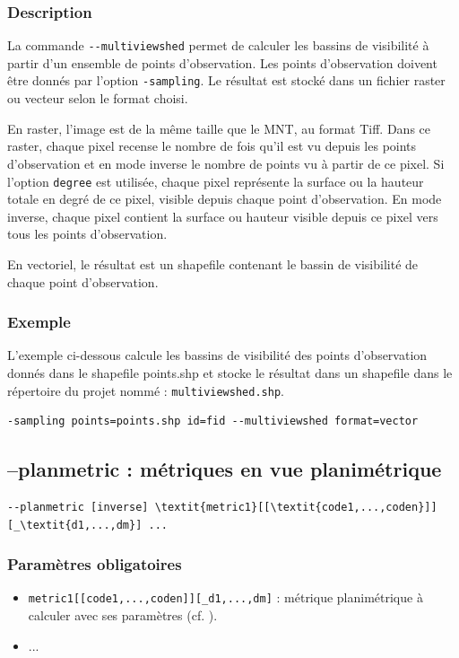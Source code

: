 \documentclass{report}
\begin{document}
\subsubsection{Description}
La commande \verb|--multiviewshed| permet de calculer les bassins de visibilité à partir d'un ensemble de points d'observation. Les points d'observation doivent être donnés par l'option \verb|-sampling|. Le résultat est stocké dans un fichier raster ou vecteur selon le format choisi. 

En raster, l'image est de la même taille que le MNT, au format Tiff. Dans ce raster, chaque pixel recense le nombre de fois qu'il est vu depuis les points d'observation et en mode inverse le nombre de points vu à partir de ce pixel. Si l'option \verb|degree| est utilisée, chaque pixel représente la surface ou la hauteur totale en degré de ce pixel, visible depuis chaque point d'observation. En mode inverse, chaque pixel contient la surface ou hauteur visible depuis ce pixel vers tous les points d'observation.

En vectoriel, le résultat est un shapefile contenant le bassin de visibilité de chaque point d'observation.

\subsubsection{Exemple}
L'exemple ci-dessous calcule les bassins de visibilité des points d'observation donnés dans le shapefile points.shp et stocke le résultat dans un shapefile dans le répertoire du projet nommé : \verb|multiviewshed.shp|.
\begin{Verbatim}
-sampling points=points.shp id=fid --multiviewshed format=vector
\end{Verbatim}


\subsection{--planmetric : métriques en vue planimétrique}

\begin{Verbatim}[commandchars=\\\{\}]
--planmetric [inverse] \textit{metric1}[[\textit{code1,...,coden}]][_\textit{d1,...,dm}] ...
\end{Verbatim}

\subsubsection{Paramètres obligatoires}
\begin{itemize}
	\item \verb|metric1[[code1,...,coden]][_d1,...,dm]| : métrique planimétrique à calculer avec ses paramètres (cf. ).
	\item ...
\end{itemize}
\end{document}
